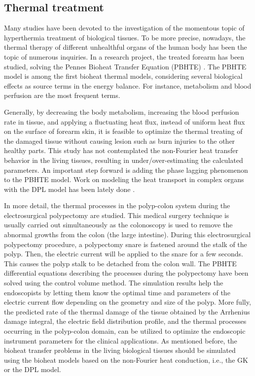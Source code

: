 \documentclass[sn-mathphys]{sn-jnl}%
\theoremstyle{thmstyleone}%
\theoremstyle{thmstyletwo}%
\theoremstyle{thmstylethree}%
\begin{document}
{%
\subsection{Thermal treatment}
Many studies have been devoted to the investigation of the momentous topic of hyperthermia treatment of biological tissues. To be more precise, nowadays, the thermal therapy of different unhealthful organs of the human body has been the topic of numerous inquiries. In a research project, the treated forearm has been studied, solving the Pennes Bioheat Transfer Equation (PBHTE) \cite{Shirkavand2019}. The PBHTE model is among the first bioheat thermal models, considering several biological effects as source terms in the energy balance. For instance, metabolism and blood perfusion are the most frequent terms.

Generally, by decreasing the body metabolism, increasing the blood perfusion rate in tissue, and applying a fluctuating heat flux, instead of uniform heat flux on the surface of forearm skin, it is feasible to optimize the thermal treating of the damaged tissue without causing lesion such as burn injuries to the other healthy parts. This study has not contemplated the non-Fourier heat transfer behavior in the living tissues, resulting in under/over-estimating the calculated parameters. An important step forward is adding the phase lagging phenomenon to the PBHTE model. Work on modeling the heat transport in complex organs with the DPL model has been lately done \cite{Ciesielski2020}.

In more detail, the thermal processes in the polyp-colon system during the electrosurgical polypectomy are studied. This medical surgery technique is usually carried out simultaneously as the colonoscopy is used to remove the abnormal growths from the colon (the large intestine). During this electrosurgical polypectomy procedure, a polypectomy snare is fastened around the stalk of the polyp. Then, the electric current will be applied to the snare for a few seconds. This causes the polyp stalk to be detached from the colon wall. The PBHTE differential equations describing the processes during the polypectomy have been solved using the control volume method. The simulation results help the endoscopists by letting them know the optimal time and parameters of the electric current flow depending on the geometry and size of the polyp. More fully, the predicted rate of the thermal damage of the tissue obtained by the Arrhenius damage integral, the electric field distribution profile, and the thermal processes occurring in the polyp-colon domain, can be utilized to optimize the endoscopic instrument parameters for the clinical applications. As mentioned before, the bioheat transfer problems in the living biological tissues should be simulated using the bioheat models based on the non-Fourier heat conduction, i.e., the GK or the DPL model.

}
\end{document}
